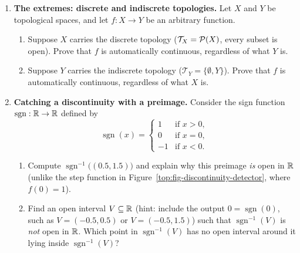 \begin{enumerate}
\item \textbf{The extremes: discrete and indiscrete topologies.}
Let $X$ and $Y$ be topological spaces, and let $f: X \to Y$ be an arbitrary function.
\begin{enumerate}[label=(\alph*)]
\item Suppose $X$ carries the discrete topology ($\mathcal{T}_X = \mathcal{P}(X)$, every subset is open). Prove that $f$ is automatically continuous, regardless of what $Y$ is.
\item Suppose $Y$ carries the indiscrete topology ($\mathcal{T}_Y = \{\emptyset, Y\}$). Prove that $f$ is automatically continuous, regardless of what $X$ is.
\end{enumerate}

\item \textbf{Catching a discontinuity with a preimage.}
Consider the sign function $\operatorname{sgn}: \mathbb{R} \to \mathbb{R}$ defined by
\[
\operatorname{sgn}(x) = \begin{cases} 1 & \text{if } x > 0, \\ 0 & \text{if } x = 0, \\ -1 & \text{if } x < 0. \end{cases}
\]
\begin{enumerate}[label=(\alph*)]
\item Compute $\operatorname{sgn}^{-1}\bigl((0.5, 1.5)\bigr)$ and explain why this preimage \emph{is} open in $\mathbb{R}$ (unlike the step function in Figure~\ref{top:fig-discontinuity-detector}, where $f(0) = 1$).
\item Find an open interval $V \subseteq \mathbb{R}$ (hint: include the output $0 = \operatorname{sgn}(0)$, such as $V = (-0.5, 0.5)$ or $V = (-0.5, 1.5)$) such that $\operatorname{sgn}^{-1}(V)$ is \emph{not} open in $\mathbb{R}$. Which point in $\operatorname{sgn}^{-1}(V)$ has no open interval around it lying inside $\operatorname{sgn}^{-1}(V)$?
\end{enumerate}
\end{enumerate}

\newpage
